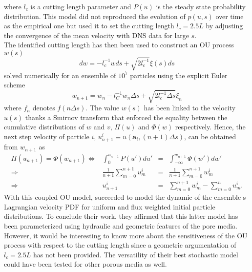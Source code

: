 where $l_c$ is a cutting length parameter and $P(u)$ is the steady state probability distribution. 
This model did not reproduced the evolution of $p(u,s)$ over time as the empirical one but \citeauthor{Puyguiraud2019} used it to set the cutting length $l_c=2.5L$ by adjusting the convergence of the mean velocity with DNS data for large $s$. \\
The identified cutting length has then been used to construct an OU process $w(s)$
\[
dw = -l_c^{-1}wds + \sqrt{2l_c^{-1}}\xi(s)ds
\]
solved numerically for an ensemble of $10^7$ particles using the explicit Euler scheme 
\[
w_{n+1}=w_n-l_C^{-1}w_n\Delta s + \sqrt{2l_c^{-1}\Delta s}\xi_n
\]
where $f_n$ denotes $f(n\Delta s)$.
The value $w(s)$ has been linked to the velocity $u(s)$ thanks a Smirnov transform that enforced the equality between the cumulative distributions of $w$ and $v$, $\Pi(u)$ and $\Phi(w)$ respectively. 
Hence, the next step velocity of particle $i$, $u_{n+1}^i\equiv u(\textbf{a}_i,(n+1)\Delta s)$, can be obtained from $w_{n+1}$ as
\[
\begin{array}{rrcl}
\Pi(u_{n+1}) = \Phi(w_{n+1}) \Leftrightarrow& \int_0^{u_{n+1}} P(u')du' &=& \int_{-\infty}^{w_{n+1}}\Phi(w')dw'\\
\Rightarrow& \frac{1}{n+1}\sum_{m=0}^{n+1}u^i_m&=&\frac{1}{n+1}\sum_{m=0}^{n+1}w^i_m\\
\Rightarrow & u^i_{n+1} &=& \sum_{m=0}^{n+1}w^i_m - \sum_{m=0}^{n}u^i_m.
\end{array}
\]
With this coupled OU model, \citeauthor{Puyguiraud2019} succeeded to model the dynamic of the ensemble s-Lagrangian velocity PDF for uniform and flux weighted initial particle distributions.
To conclude their work, they affirmed that this latter model has been parameterized using hydraulic and geometric features of the pore media. 
However, it would be interesting to know more about the sensitiveness of the OU process with respect to the cutting length since a geometric argumentation of $l_c=2.5L$ has not been provided.
The versatility of their best stochastic model could have been tested for other porous media as well.

